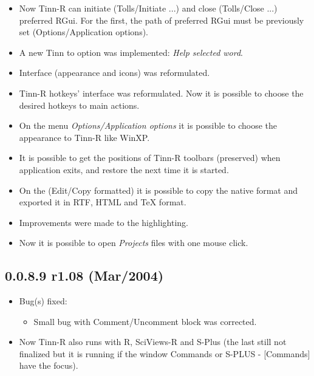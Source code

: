 \begin{itemize}
  \item Now Tinn-R can initiate (Tolls/Initiate ...) and close (Tolls/Close ...)
    preferred RGui. For the first, the path of preferred RGui must be previously
    set (Options/Application options).
  \item A new Tinn to \RR{} option was implemented: \textit{Help selected word}.
  \item Interface (appearance and icons) was reformulated.
  \item Tinn-R hotkeys' interface was reformulated. Now it is possible to choose
    the desired hotkeys to main actions.
  \item On the menu \textit{Options/Application options} it is possible to choose
    the appearance to Tinn-R like WinXP.
  \item It is possible to get the positions of Tinn-R toolbars (preserved) when
    application exits, and restore the next time it is started.
  \item On the (Edit/Copy formatted) it is possible to copy the native format
    and exported it in RTF, HTML and TeX format.
  \item Improvements were made to the highlighting.
  \item Now it is possible to open \textit{Projects} files with one mouse
    click.
\end{itemize}


\subsection*{0.0.8.9 r1.08 (Mar/2004)}
\begin{itemize}
  \item Bug(s) fixed:
    \begin{itemize}
      \item Small bug with Comment/Uncomment block was corrected.
    \end{itemize}
  \item Now Tinn-R also runs with R, SciViews-R and S-Plus (the last still not
    finalized but it is running if the window Commands or S-PLUS - [Commands]
    have the focus).
\end{itemize}


